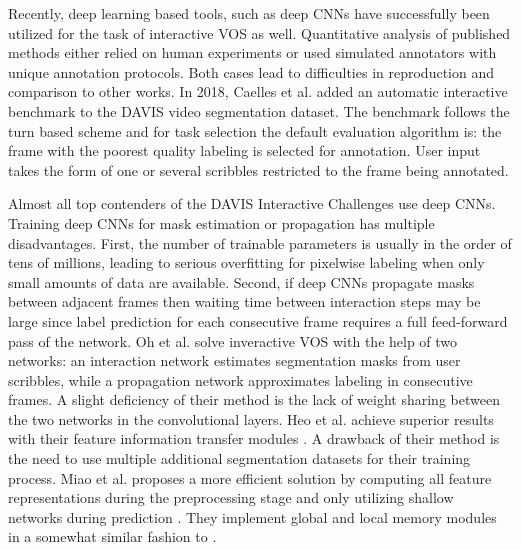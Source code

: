 \documentclass[conference]{IEEEtran}
\begin{document}
Recently, deep learning based tools, such as deep CNNs have successfully been utilized for the task of interactive VOS as well. Quantitative analysis of published methods either relied on human experiments or used simulated annotators with unique annotation protocols. Both cases lead to difficulties in reproduction and comparison to other works. In 2018, Caelles et al. \cite{davis_challenge18} added an automatic interactive benchmark to the DAVIS video segmentation dataset. The benchmark follows the turn based scheme and for task selection the default evaluation algorithm is: the frame with the poorest quality labeling is selected for annotation. User input takes the form of one or several scribbles restricted to the frame being annotated.

Almost all top contenders of the DAVIS Interactive Challenges use deep CNNs. Training deep CNNs for mask estimation or propagation has multiple disadvantages. First, the number of trainable parameters is usually in the order of tens of millions, leading to serious overfitting for pixelwise labeling when only small amounts of data are available. Second, if deep CNNs propagate masks between adjacent frames then waiting time between interaction steps may be large since label prediction for each consecutive frame requires a full feed-forward pass of the network. Oh et al. solve \cite{interactive_oh_cvpr19} inveractive VOS with the help of two networks: an interaction network estimates segmentation masks from user scribbles, while a propagation network approximates labeling in consecutive frames. A slight deficiency of their method is the lack of weight sharing between the two networks in the convolutional layers. Heo et al. achieve superior results with their feature information transfer modules \cite{interactive20_1st}. A drawback of their method is the need to use multiple additional segmentation datasets for their training process. Miao et al. proposes a more efficient solution by computing all feature representations during the preprocessing stage and only utilizing shallow networks during prediction \cite{interactive_ma_net}. They implement global and local memory modules in a somewhat similar fashion to \cite{interactive20_1st}.


\newcommand\figqualwidthratioB{0.19}
\end{document}
